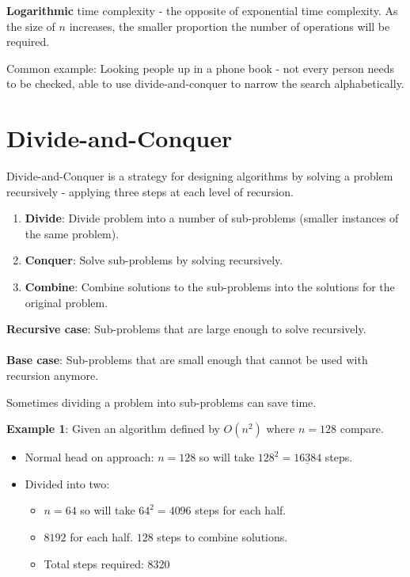 \documentclass[10pt,a4paper]{article}
\begin{document}
\textbf{Logarithmic} time complexity - the opposite of exponential time complexity. As the size of
$n$ increases, the smaller proportion the number of operations will be required. \par 

Common example: Looking people up in a phone book - not every person needs to be checked, able to
use divide-and-conquer to narrow the search alphabetically.

\section{Divide-and-Conquer}

Divide-and-Conquer is a strategy for designing algorithms by solving a problem recursively -
applying three steps at each level of recursion.

\begin{enumerate}
    \item \textbf{Divide}: Divide problem into a number of sub-problems (smaller instances of the
    same problem).
    \item \textbf{Conquer}: Solve sub-problems by solving recursively.
    \item \textbf{Combine}: Combine solutions to the sub-problems into the solutions for the
    original problem.
\end{enumerate}

\begin{tcolorbox}[breakable,colback=white]
\textbf{Recursive case}: Sub-problems that are large enough to solve recursively.
\\
\\
\textbf{Base case}: Sub-problems that are small enough that cannot be used with recursion anymore.
\end{tcolorbox}

Sometimes dividing a problem into sub-problems can save time. 

\textbf{Example 1}: Given an algorithm defined by $O(n^2)$ where $n=128$ compare.
\begin{itemize}
    \item Normal head on approach: $n=128$ so will take $128^2 = \underline{16 384}$ steps.
    \item Divided into two: 
    \begin{itemize}
        \item $n=64$ so will take $64^2=4 096$ steps for each half.
        \item $8 192$ for each half. $128$ steps to combine solutions.
        \item Total steps required: \underline{$8 320$} 
    \end{itemize}  
\end{itemize}
\end{document}
